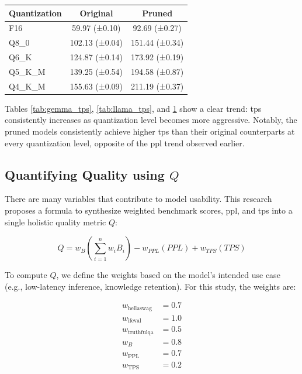 \documentclass{ifacconf}
\begin{document}
	\begin{table}[H]
		\centering
		\begin{tabular}{|l|c|c|}
			\hline
			\textbf{Quantization} & \textbf{Original} & \textbf{Pruned} \\ \hline
			F16 & 59.97 (±0.10) & 92.69 (±0.27) \\ \hline
			Q8\_0 & 102.13 (±0.04) & 151.44 (±0.34) \\ \hline
			Q6\_K & 124.87 (±0.14) & 173.92 (±0.19) \\ \hline
			Q5\_K\_M & 139.25 (±0.54) & 194.58 (±0.87) \\ \hline
			Q4\_K\_M & 155.63 (±0.09) & 211.19 (±0.37) \\ \hline
		\end{tabular}
		\label{tab:qwen_tps}
	\end{table}
	
	Tables \ref{tab:gemma_tps}, \ref{tab:llama_tps}, and \ref{tab:qwen_tps} show a clear trend: \gls{tps} consistently increases as quantization level becomes more aggressive. Notably, the pruned models consistently achieve higher \gls{tps} than their original counterparts at every quantization level, opposite of the \gls{ppl} trend observed earlier.
	
	\subsection{Quantifying Quality using $Q$}
	There are many variables that contribute to model usability. This research proposes a formula to synthesize weighted benchmark scores, \gls{ppl}, and \gls{tps} into a single holistic quality metric $Q$:
	
	$$
	Q = w_{B} \left( \sum_{i=1}^{n} w_i B_i \right) - w_{PPL} \left( PPL \right) + w_{TPS}(TPS) 
	$$
	
	To compute $Q$, we define the weights based on the model's intended use case (e.g., low-latency inference, knowledge retention). For this study, the weights are:
	
	\begin{align*}
		w_{\text{hellaswag}} &= 0.7 \\
		w_{\text{ifeval}} &= 1.0 \\
		w_{\text{truthfulqa}} &= 0.5 \\
		w_{B} &= 0.8 \\
		w_{\text{PPL}} &= 0.7 \\
		w_{\text{TPS}} &= 0.2
	\end{align*}
	
\end{document}
